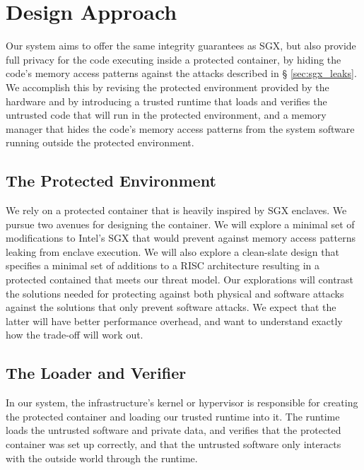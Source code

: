 \section{Design Approach}
\label{sec:design}

Our system aims to offer the same integrity guarantees as SGX, but also provide
full privacy for the code executing inside a protected container, by hiding the
code's memory access patterns against the attacks described in \S
\ref{sec:sgx_leaks}. We accomplish this by revising the protected environment
provided by the hardware and by introducing a trusted runtime that loads and
verifies the untrusted code that will run in the protected environment, and a
memory manager that hides the code's memory access patterns from the
system software running outside the protected environment.


\subsection{The Protected Environment}
\label{sec:protected_environment}

We rely on a protected container that is heavily inspired by SGX enclaves. We
pursue two avenues for designing the container. We will explore a minimal set
of modifications to Intel's SGX that would prevent against memory access
patterns leaking from enclave execution. We will also explore a clean-slate
design that specifies a minimal set of additions to a RISC architecture
resulting in a protected contained that meets our threat model. Our
explorations will contrast the solutions needed for protecting against both
physical and software attacks against the solutions that only prevent software
attacks. We expect that the latter will have better performance overhead, and
want to understand exactly how the trade-off will work out.


\subsection{The Loader and Verifier}
\label{sec:loader_verifier}

In our system, the infrastructure's kernel or hypervisor is responsible for
creating the protected container and loading our trusted runtime into it. The
runtime loads the untrusted software and private data, and verifies that the
protected container was set up correctly, and that the untrusted software
only interacts with the outside world through the runtime.


